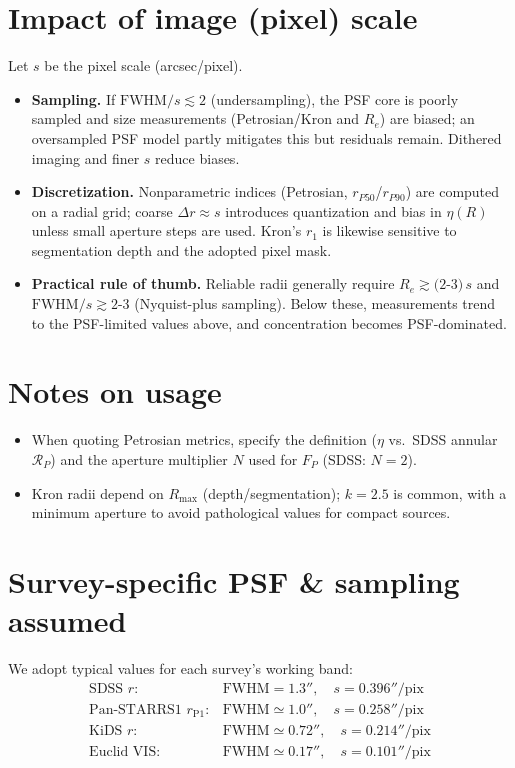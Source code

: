 \documentclass[12pt]{article}
\begin{document}
\section*{Impact of image (pixel) scale}
Let $s$ be the pixel scale (arcsec/pixel).
\begin{itemize}
\item \textbf{Sampling.} If $\mathrm{FWHM}/s \lesssim 2$ (undersampling), the PSF core is poorly sampled and size measurements (Petrosian/Kron and $R_e$) are biased; an oversampled PSF model partly mitigates this but residuals remain. Dithered imaging and finer $s$ reduce biases.
\item \textbf{Discretization.} Nonparametric indices (Petrosian, $r_{P50}$/$r_{P90}$) are computed on a radial grid; coarse $\Delta r\!\approx\!s$ introduces quantization and bias in $\eta(R)$ unless small aperture steps are used. Kron’s $r_1$ is likewise sensitive to segmentation depth and the adopted pixel mask.
\item \textbf{Practical rule of thumb.} Reliable radii generally require $R_e \gtrsim (2$-$3)\,s$ and $\mathrm{FWHM}/s \gtrsim 2$-$3$ (Nyquist-plus sampling). Below these, measurements trend to the PSF-limited values above, and concentration becomes PSF-dominated.
\end{itemize}

\section*{Notes on usage}
\begin{itemize}
\item When quoting Petrosian metrics, specify the definition ($\eta$ vs.\ SDSS annular $\mathcal{R}_P$) and the aperture multiplier $N$ used for $F_P$ (SDSS: $N{=}2$).
\item Kron radii depend on $R_{\max}$ (depth/segmentation); $k=2.5$ is common, with a minimum aperture to avoid pathological values for compact sources.
\end{itemize}


\section*{Survey-specific PSF \& sampling assumed}
We adopt typical values for each survey’s working band:
\[
\begin{array}{lcl}
\text{SDSS }r: & \mathrm{FWHM}=1.3'' ,\quad s=0.396''/\mathrm{pix} \\
\text{Pan-STARRS1 }r_\mathrm{P1}: & \mathrm{FWHM}\simeq 1.0'' ,\quad s=0.258''/\mathrm{pix} \\
\text{KiDS }r: & \mathrm{FWHM}\simeq 0.72'' ,\quad s=0.214''/\mathrm{pix} \\
\text{Euclid VIS}: & \mathrm{FWHM}\simeq 0.17'' ,\quad s=0.101''/\mathrm{pix} \\
\end{array}
\]
\end{document}
